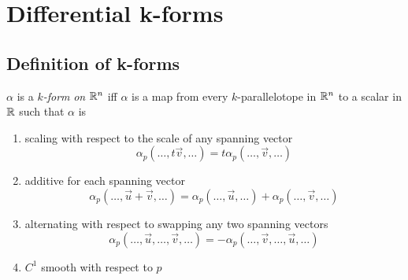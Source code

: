\documentclass[notes]{subfiles}
\begin{document}
\setcounter{section}{6}
\section{Differential k-forms}
\subsection{Definition of k-forms}

\begin{definition}
    $\alpha$ is a \textit{$k$-form} \textit{on} $\mathbb{R}^n$ iff $\alpha$ is a map from every $k$-parallelotope in $\mathbb{R}^n$ to a scalar in $\mathbb{R}$ such that $\alpha$ is
    \begin{enumerate}[label = (\arabic*)]
        \item scaling with respect to the scale of any spanning vector
        \[
            \alpha_p(\ldots, t\vec{v}, \ldots) = t\alpha_p(\ldots, \vec{v}, \ldots)
        \]
        \item additive for each spanning vector
        \[
            \alpha_p(\ldots, \vec{u} + \vec{v}, \ldots) = \alpha_p(\ldots, \vec{u}, \ldots) + \alpha_p(\ldots, \vec{v}, \ldots)
        \]
        \item alternating with respect to swapping any two spanning vectors
        \[
            \alpha_p(\ldots, \vec{u}, \ldots, \vec{v}, \ldots) = -\alpha_p(\ldots, \vec{v}, \ldots, \vec{u}, \ldots)
        \]
        \item $C^1$ smooth with respect to $p$
    \end{enumerate}
\end{definition}
\end{document}
